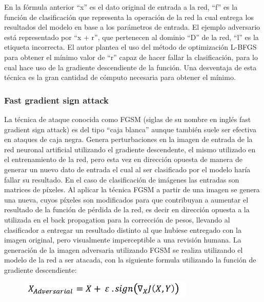 En la fórmula anterior “x” es el dato original de entrada a la red, “f” es la función de clasificación que representa la operación de la red la cual entrega los resultados del modelo en base a los parámetros de entrada. El ejemplo adversario está representado por “x + r”, que pertenecen al dominio “D” de la red, “l” es la etiqueta incorrecta. El autor plantea el uso del método de optimización L-BFGS para obtener el mínimo valor de “r” capaz de hacer fallar la clasificación, para lo cual hace uso de la gradiente descendiente de la función. Una desventaja de esta técnica es la gran cantidad de cómputo necesaria para obtener el mínimo.



\subsubsection{Fast gradient sign attack}

La técnica de ataque conocida como FGSM (siglas de su nombre en inglés fast gradient sign attack) \parencite{r3} es del tipo “caja blanca” aunque también suele ser efectiva en ataques de caja negra. Genera perturbaciones en la imagen de entrada de la red neuronal artificial utilizando el gradiente descendente, el mismo utilizado en el entrenamiento de la red, pero esta vez en dirección opuesta de manera de generar un nuevo dato de entrada el cual al ser clasificado por el modelo haría fallar su resultado. En el caso de clasificación de imágenes las entradas son matrices de píxeles. Al aplicar la técnica FGSM a partir de una imagen se genera una nueva, cuyos píxeles son modificados para que contribuyan a aumentar el resultado de la función de pérdida de la red, es decir en dirección opuesta a la utilizada en el back propagation para la corrección de pesos, llevando al clasificador a entregar un resultado distinto al que hubiese entregado con la imagen original, pero visualmente imperceptible a una revisión humana.
La generación de la imagen adversaria utilizando FGSM se realiza utilizando el modelo de la red a ser atacada, con la siguiente formula \parencite{r3} utilizando la función de gradiente descendiente:

\begin{figure}[th]
\centering
\includegraphics [scale = 0.75]{Figures/formula2.PNG}
\label{fig:f2}
\end{figure}

